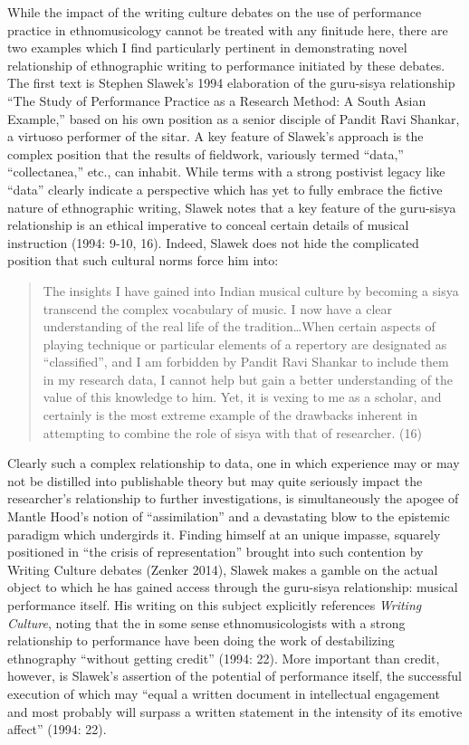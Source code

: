 While the impact of the writing culture debates on the use of
performance practice in ethnomusicology cannot be treated with any
finitude here, there are two examples which I find particularly
pertinent in demonstrating novel relationship of ethnographic writing to
performance initiated by these debates. The first text is Stephen
Slawek's 1994 elaboration of the guru-sisya relationship ``The Study of
Performance Practice as a Research Method: A South Asian Example,''
based on his own position as a senior disciple of Pandit Ravi Shankar, a
virtuoso performer of the sitar. A key feature of Slawek's approach is
the complex position that the results of fieldwork, variously termed
``data,'' ``collectanea,'' etc., can inhabit. While terms with a strong
postivist legacy like ``data'' clearly indicate a perspective which has
yet to fully embrace the fictive nature of ethnographic writing, Slawek
notes that a key feature of the guru-sisya relationship is an ethical
imperative to conceal certain details of musical instruction (1994:
9-10, 16). Indeed, Slawek does not hide the complicated position that
such cultural norms force him into:

\begin{quote}
The insights I have gained into Indian musical culture by becoming a
sisya transcend the complex vocabulary of music. I now have a clear
understanding of the real life of the tradition\ldots When certain
aspects of playing technique or particular elements of a repertory are
designated as ``classified'', and I am forbidden by Pandit Ravi Shankar
to include them in my research data, I cannot help but gain a better
understanding of the value of this knowledge to him. Yet, it is vexing
to me as a scholar, and certainly is the most extreme example of the
drawbacks inherent in attempting to combine the role of sisya with that
of researcher. (16)
\end{quote}

Clearly such a complex relationship to data, one in which experience may
or may not be distilled into publishable theory but may quite seriously
impact the researcher's relationship to further investigations, is
simultaneously the apogee of Mantle Hood's notion of ``assimilation''
and a devastating blow to the epistemic paradigm which undergirds it.
Finding himself at an unique impasse, squarely positioned in ``the
crisis of representation'' brought into such contention by Writing
Culture debates (Zenker 2014), Slawek makes a gamble on the actual
object to which he has gained access through the guru-sisya
relationship: musical performance itself. His writing on this subject
explicitly references \emph{Writing Culture}, noting that the in some
sense ethnomusicologists with a strong relationship to performance have
been doing the work of destabilizing ethnography ``without getting
credit'' (1994: 22). More important than credit, however, is Slawek's
assertion of the potential of performance itself, the successful
execution of which may ``equal a written document in intellectual
engagement and most probably will surpass a written statement in the
intensity of its emotive affect'' (1994: 22).

